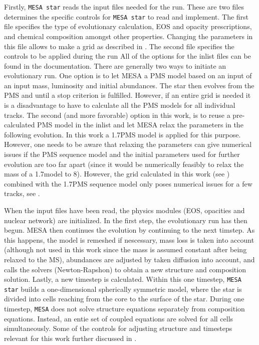 Firstly, \texttt{MESA star} reads the input files needed for the run. These are two files determines the specific controls for \texttt{MESA star} to read and implement. The first file specifies the type of evolutionary calculation, EOS and opacity prescriptions, and chemical composition amongst other properties. Changing the parameters in this file allows to make a grid as described in . The second file specifies the controls to be applied during the run
All of the options for the inlist files can be found in the documentation. There are generally two ways to initiate an evolutionary run. One option is to let MESA a PMS model based on an input of an input mass, luminosity and initial abundances. The star then evolves from the PMS and until a stop criterion is fulfilled. However, if an entire grid is needed it is a disadvantage to have to calculate all the PMS models for all individual tracks. The second (and more favorable) option in this work, is to reuse a pre-calculated PMS model in the inlist and let MESA relax the parameters in the following evolution. In this work a 1.7\msun PMS model is applied for this purpose. However, one needs to be aware that relaxing the parameters can give numerical issues if the PMS sequence model and the initial parameters used for further evolution are too far apart (since it would be numerically feasibly to relax the mass of a 1.7\msun model to 8\msun). However, the grid calculated in this work (see ) combined with the 1.7\msun PMS sequence model only poses numerical issues for a few tracks, see . 

When the input files have been read, the physics modules (EOS, opacities and nuclear network) are initialized. In the first step, the evolutionary run has then begun. MESA then continues the evolution by continuing to the next timstep. As this happens, the model is remeshed if nescessary, mass loss is taken into account (although not used in this work since the mass is assumed constant after being relaxed to the MS), abundances are adjusted by taken diffusion into account, and calls the solvers (Newton-Rapshon) to obtain a new structure and composition solution. Lastly, a new timestep is calculated. Within this one timestep, \texttt{MESA star} builds a one-dimensional spherically symmetric model, where the star is divided into cells reaching from the core to the surface of the star. During one timestep, \texttt{MESA} does not solve structure equations separately from composition equations. Instead, an entie set of coupled equations are solved for all cells simultaneously. Some of the controls for adjusting structure and timesteps relevant for this work further discussed in .

